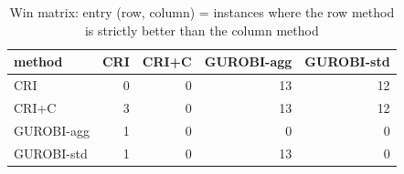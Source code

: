 \begin{table}[htbp]
\centering
\small
\caption{Win matrix: entry (row, column) = instances where the row method is strictly better than the column method}
\label{tab:E3_long_runs_b600_wins}
\begin{tabular}{lrrrr}
\toprule
method & CRI & CRI+C & GUROBI-agg & GUROBI-std \\
\midrule
CRI & 0 & 0 & 13 & 12 \\
CRI+C & 3 & 0 & 13 & 12 \\
GUROBI-agg & 1 & 0 & 0 & 0 \\
GUROBI-std & 1 & 0 & 13 & 0 \\
\bottomrule
\end{tabular}
\end{table}
